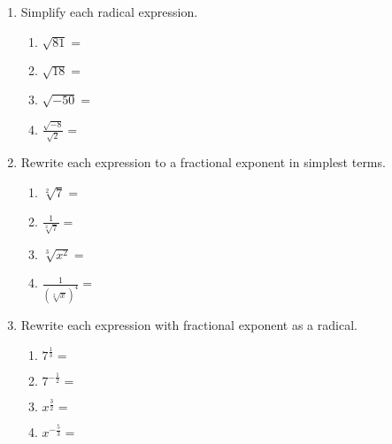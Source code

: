\documentclass[12pt, twoside]{article}
\begin{document}
\begin{enumerate}[itemsep=0.5cm]
\item Simplify each radical expression.
    \begin{multicols}{2}
    \begin{enumerate}[itemsep=0.5cm]
        \item $\sqrt{81}=$
        \item $\sqrt{18}=$
        \item $\sqrt{-50}=$
        \item $\displaystyle \frac{\sqrt{-8}}{\sqrt{2}}=$
    \end{enumerate}
    \end{multicols} \vspace{1cm}
    
\item Rewrite each expression to a fractional exponent in simplest terms.
    \begin{multicols}{2}
      \begin{enumerate}[itemsep=1cm]
          \item $\sqrt[2]{7} =$
          \item $\displaystyle \frac{1}{\sqrt[2]{7}}=$
          \item $\sqrt[3]{x^2} =$
          \item $\displaystyle \frac{1}{(\sqrt[2]{x})^4}=$
      \end{enumerate}
      \end{multicols} \vspace{1cm}
  
\item Rewrite each expression with fractional exponent as a radical.
    \begin{multicols}{2}
      \begin{enumerate}[itemsep=1cm]
        \item $\displaystyle 7^{\frac{1}{3}}=$
        \item $\displaystyle 7^{-\frac{1}{2}}=$
        \item $\displaystyle x^{\frac{3}{2}}=$
        \item $\displaystyle x^{-\frac{5}{3}}=$
      \end{enumerate}
      \end{multicols}

\newpage




\end{enumerate}
\end{document}
